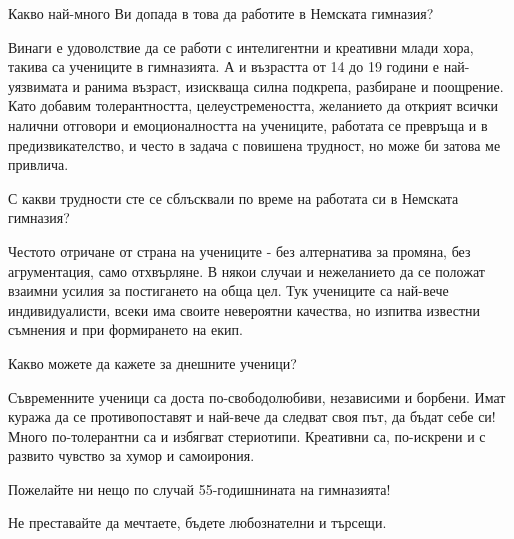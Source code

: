 \begin{multicols}{2}

\noindent \begin{window} \end{window}

Какво най-много Ви допада в това да работите в Немската гимназия? 

Винаги е удоволствие да се работи с интелигентни и креативни млади хора, такива са учениците в гимназията. А и възрастта от 14 до 19 години е най-уязвимата и ранима възраст, изискваща силна подкрепа, разбиране и поощрение. Като добавим толерантността, целеустремеността, желанието да открият всички налични отговори и емоционалността на учениците, работата се превръща и в предизвикателство, и често в задача с повишена трудност, но може би затова ме привлича. 

С какви трудности сте се сблъсквали по време на работата си в Немската гимназия?

Честото отричане от страна на учениците - без алтернатива за промяна, без агрументация, само отхвърляне. В някои случаи и нежеланието да се положат взаимни усилия за постигането на обща цел. Тук учениците са най-вече индивидуалисти, всеки има своите невероятни качества, но изпитва известни съмнения и при формирането на екип. 

Какво можете да кажете за днешните ученици? 

Съвременните ученици са доста по-свободолюбиви, независими и борбени. Имат куража да се противопоставят и най-вече да следват своя път, да бъдат себе си! Много по-толерантни са и избягват стериотипи. Креативни са, по-искрени и с развито чувство за хумор и самоирония.

Пожелайте ни нещо по случай 55-годишнината на гимназията! 

Не преставайте да мечтаете, бъдете любознателни и търсещи.

\end{multicols}
